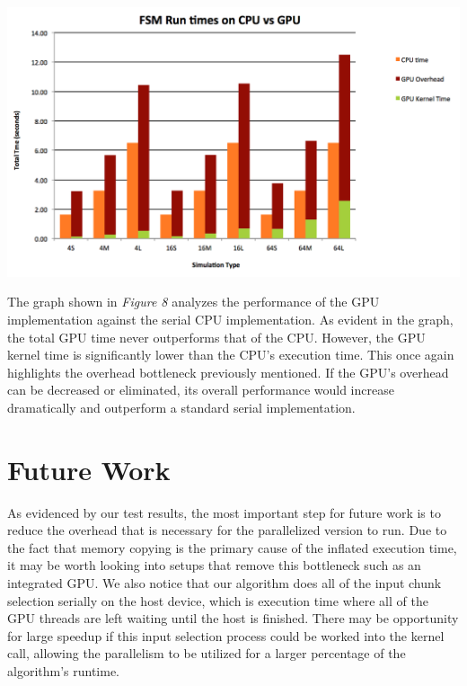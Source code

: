 \documentclass[11pt]{sigplanconf}
\newenvironment{Figure} %
  {\par\medskip\noindent\minipage{\linewidth}}
  {\endminipage\par\medskip}
\begin{document}
\begin{Figure}
\centering
\includegraphics[width=\linewidth]{cpu_vs_gpu.png}
\label{fig:CPU vs. GPU}
\end{Figure}

The graph shown in \textit{Figure 8} analyzes the performance of the GPU implementation against the serial CPU implementation. As evident in the graph, the total GPU time never outperforms that of the CPU. However, the GPU kernel time is significantly lower than the CPU's execution time. This once again highlights the overhead bottleneck previously mentioned. If the GPU's overhead can be decreased or eliminated, its overall performance would increase dramatically and outperform a standard serial implementation.



\section{Future Work}

As evidenced by our test results, the most important step for future work is to reduce the overhead that is necessary for the parallelized version to run. Due to the fact that memory copying is the primary cause of the inflated execution time, it may be worth looking into setups that remove this bottleneck such as an integrated GPU. We also notice that our algorithm does all of the input chunk selection serially on the host device, which is execution time where all of the GPU threads are left waiting until the host is finished. There may be opportunity for large speedup if this input selection process could be worked into the kernel call, allowing the parallelism to be utilized for a larger percentage of the algorithm's runtime.
\end{document}
